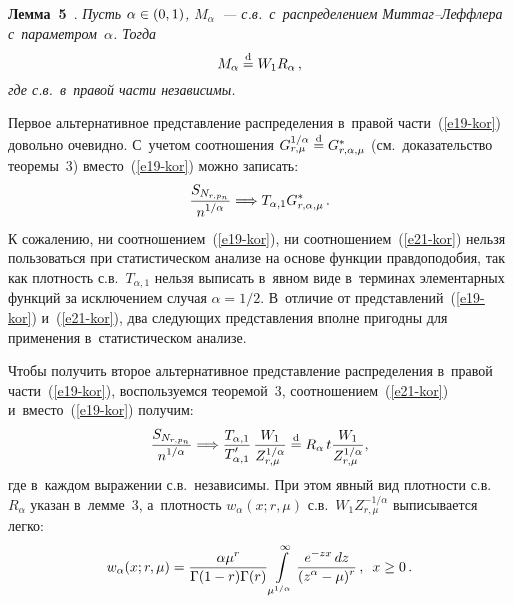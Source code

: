 \begin{multicols}{2}
\smallskip

\noindent
\textbf{Лемма~5}~\cite{KorolevZeifman2016b, KotzOstrovskii1996,
KorolevZeifman2016a}. \textit{Пусть $\alpha\hm\in(0,1)$, $M_{\alpha}$~---
с.в.\ с~распределением Мит\-таг--Леф\-фле\-ра с~параметром~$\alpha$. Тогда}
$$
M_{\alpha}\stackrel{\mathrm{d}}{=} W_1  R_{\alpha}\,,
$$
\textit{где с.в.\ в~правой части независимы.}

\smallskip

Первое альтернативное представление распределения в~правой части~(\ref{e19-kor}) 
довольно очевидно. С~учетом соотношения
$G_{r,\mu}^{1/\alpha}\stackrel{\mathrm{d}}{=} G^*_{r,\alpha,\mu}$ (см.\ доказательство
теоремы~3) вместо~(\ref{e19-kor}) можно записать:
\begin{equation}
\displaystyle\frac{\displaystyle S_{N_{r,p_n}}\mathstrut}{\displaystyle n^{1/\alpha}\mathstrut}\Longrightarrow T_{\alpha,1}
G^*_{r,\alpha,\mu}\,.\label{e21-kor}
\end{equation}
К сожалению, ни соотношением~(\ref{e19-kor}), ни соотношением~(\ref{e21-kor}) нельзя
пользоваться при статистическом анализе на основе функции
правдоподобия, так как плотность с.в.~$T_{\alpha,1}$ нельзя
выписать в~явном виде в~терминах элементарных функций за исключением
случая $\alpha=1/2$. В~отличие от представлений~(\ref{e19-kor}) и~(\ref{e21-kor}), два
следующих представления вполне пригодны для применения 
в~статистическом анализе.

Чтобы получить второе альтернативное пред\-став\-ле\-ние распределения 
в~правой части~(\ref{e19-kor}), воспользуемся теоремой~3, соотношением~(\ref{e21-kor}) 
и~вмес\-то~(\ref{e19-kor}) получим:
$$
\displaystyle\frac{\displaystyle S_{N_{r,p_n}}\mathstrut}{\displaystyle n^{1/\alpha}\mathstrut}\Longrightarrow
\displaystyle\frac{\displaystyle T_{\alpha,1}\mathstrut}{\displaystyle T'_{\alpha,1}\mathstrut}\,
\displaystyle\frac{\displaystyle W_1\mathstrut}{\displaystyle Z_{r,\mu}^{1/\alpha}\mathstrut}\stackrel{\mathrm{d}}{=}
R_{\alpha}\,t\displaystyle\frac{\displaystyle W_1\mathstrut}{\displaystyle Z_{r,\mu}^{1/\alpha}\mathstrut},
$$
где в~каждом выражении с.в.\ независимы. При этом явный вид
плотности с.в.~$R_{\alpha}$ указан в~лемме~3, а~плот\-ность
$w_{\alpha}(x;r,\mu)$ с.в.~$W_1Z_{r,\mu}^{-1/\alpha}$ выписывается
легко:
$$
w_{\alpha}(x;r,\mu)=\displaystyle\frac{\displaystyle \alpha\mu^r\mathstrut}{\displaystyle \Gamma(1-r)\Gamma(r)\mathstrut}
\int\limits_{\mu^{1/\alpha}}^{\infty}\displaystyle\frac{\displaystyle e^{-zx}\,dz\mathstrut}{\displaystyle (z^{\alpha}-\mu)^r\mathstrut}\,,\enskip
x\ge0\,.
$$


\end{multicols}
